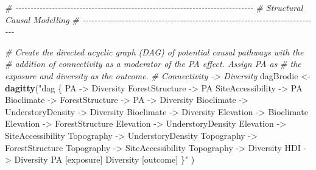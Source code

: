 \documentclass[
]{article}
\newenvironment{Shaded}{\begin{snugshade}}{\end{snugshade}}
\newcommand{\CommentTok}[1]{\textcolor[rgb]{0.56,0.35,0.01}{\textit{#1}}}
\newcommand{\FunctionTok}[1]{\textcolor[rgb]{0.13,0.29,0.53}{\textbf{#1}}}
\newcommand{\NormalTok}[1]{#1}
\newcommand{\OtherTok}[1]{\textcolor[rgb]{0.56,0.35,0.01}{#1}}
\newcommand{\StringTok}[1]{\textcolor[rgb]{0.31,0.60,0.02}{#1}}
\begin{document}
\begin{Shaded}
\begin{Highlighting}[]
\CommentTok{\# {-}{-}{-}{-}{-}{-}{-}{-}{-}{-}{-}{-}{-}{-}{-}{-}{-}{-}{-}{-}{-}{-}{-}{-}{-}{-}{-}{-}{-}{-}{-}{-}{-}{-}{-}{-}{-}{-}{-}{-}{-}{-}{-}{-}{-}{-}{-}{-}{-}{-}{-}{-}{-}{-}{-}{-}{-}{-}{-}{-}{-}{-}{-}{-}{-}{-}{-}{-}{-}{-}{-}{-}{-}{-}{-}{-}{-}{-}}
\CommentTok{\# Structural Causal Modelling  }
\CommentTok{\# {-}{-}{-}{-}{-}{-}{-}{-}{-}{-}{-}{-}{-}{-}{-}{-}{-}{-}{-}{-}{-}{-}{-}{-}{-}{-}{-}{-}{-}{-}{-}{-}{-}{-}{-}{-}{-}{-}{-}{-}{-}{-}{-}{-}{-}{-}{-}{-}{-}{-}{-}{-}{-}{-}{-}{-}{-}{-}{-}{-}{-}{-}{-}{-}{-}{-}{-}{-}{-}{-}{-}{-}{-}{-}{-}{-}{-}{-}}

\CommentTok{\# Create the directed acyclic graph (DAG) of potential causal pathways with the }
\CommentTok{\# addition of connectivity as a moderator of the PA effect. Assign PA as }
\CommentTok{\# the exposure and diversity as the outcome.}
\CommentTok{\# Connectivity {-}\textgreater{} Diversity}
\NormalTok{dagBrodie }\OtherTok{\textless{}{-}} \FunctionTok{dagitty}\NormalTok{(}\StringTok{"dag \{}
\StringTok{  PA {-}\textgreater{} Diversity}
\StringTok{  ForestStructure {-}\textgreater{} PA}
\StringTok{  SiteAccessibility {-}\textgreater{} PA}
\StringTok{  Bioclimate {-}\textgreater{} ForestStructure {-}\textgreater{} PA {-}\textgreater{} Diversity}
\StringTok{  Bioclimate {-}\textgreater{} UnderstoryDensity {-}\textgreater{} Diversity}
\StringTok{  Bioclimate {-}\textgreater{} Diversity}
\StringTok{  Elevation {-}\textgreater{} Bioclimate}
\StringTok{  Elevation {-}\textgreater{} ForestStructure}
\StringTok{  Elevation {-}\textgreater{} UnderstoryDensity}
\StringTok{  Elevation {-}\textgreater{} SiteAccessibility}
\StringTok{  Topography {-}\textgreater{} UnderstoryDensity}
\StringTok{  Topography {-}\textgreater{} ForestStructure}
\StringTok{  Topography {-}\textgreater{} SiteAccessibility}
\StringTok{  Topography {-}\textgreater{} Diversity}
\StringTok{  HDI {-}\textgreater{} Diversity}
\StringTok{  PA [exposure]}
\StringTok{  Diversity [outcome]}
\StringTok{               \}"}
\NormalTok{)}


\end{Highlighting}
\end{Shaded}
\end{document}
